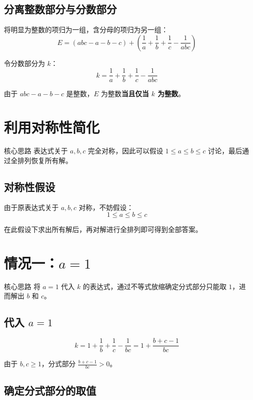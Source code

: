 \documentclass[11pt,a4paper]{ctexart}
\newcommand{\highlight}[1]{\colorbox{accent!20}{\sffamily\bfseries #1}}
\begin{document}
\subsection*{分离整数部分与分数部分}

将明显为整数的项归为一组，含分母的项归为另一组：
\[
  E = (abc - a - b - c) + \left(\frac{1}{a} + \frac{1}{b} + \frac{1}{c} - \frac{1}{abc}\right)
\]

令分数部分为 $k$：
\[
  k = \frac{1}{a} + \frac{1}{b} + \frac{1}{c} - \frac{1}{abc}
\]

由于 $abc-a-b-c$ 是整数，$E$ 为整数\highlight{当且仅当 $k$ 为整数}。

\section{利用对称性简化}

\begin{methodbox}{核心思路}
表达式关于 $a,b,c$ 完全对称，因此可以假设 $1 \le a \le b \le c$ 讨论，最后通过全排列恢复所有解。
\end{methodbox}

\subsection*{对称性假设}

由于原表达式关于 $a,b,c$ 对称，不妨假设：
\[
  1 \le a \le b \le c
\]

在此假设下求出所有解后，再对解进行全排列即可得到全部答案。

\section{情况一：$a = 1$}

\begin{methodbox}{核心思路}
将 $a=1$ 代入 $k$ 的表达式，通过不等式放缩确定分式部分只能取 $1$，进而解出 $b$ 和 $c$。
\end{methodbox}

\subsection*{代入 $a=1$}

\[
  k = 1 + \frac{1}{b} + \frac{1}{c} - \frac{1}{bc}
    = 1 + \frac{b + c - 1}{bc}
\]

由于 $b,c \ge 1$，分式部分 $\frac{b+c-1}{bc} > 0$。

\subsection*{确定分式部分的取值}
\end{document}
